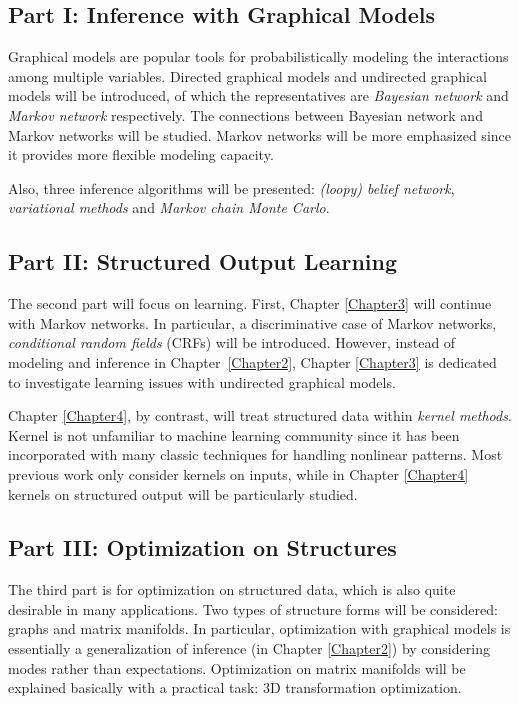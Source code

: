 \subsection{Part I: Inference with Graphical Models}
Graphical models are popular tools for probabilistically modeling the interactions among multiple variables. Directed graphical models and undirected graphical models will be introduced, of which 
the representatives are \emph{Bayesian network} and \emph{Markov network} 
respectively. The connections between Bayesian network and Markov networks will be studied.  Markov networks will be more emphasized 
since it provides more flexible modeling capacity.        

Also, three inference algorithms will be presented: \emph{(loopy) belief network}, \emph{variational methods} and \emph{Markov chain Monte Carlo}. 
\subsection{Part II: Structured Output Learning}
The second part will focus on learning. First, Chapter \ref{Chapter3} will continue with Markov networks. In particular, a discriminative case of Markov networks, \emph{conditional random fields} (CRFs) 
will be introduced. However, instead of modeling and inference in Chapter~\ref{Chapter2}, Chapter \ref{Chapter3} is dedicated to investigate learning issues with undirected graphical models.          

Chapter \ref{Chapter4}, by contrast, will treat structured data within \emph{kernel methods}. Kernel is not unfamiliar to machine learning community since it has been incorporated with many 
classic techniques for handling nonlinear patterns. Most previous work only consider kernels on inputs, while in Chapter \ref{Chapter4} kernels on structured output will be particularly 
studied.         


\subsection{Part III: Optimization on Structures}
The third part is for optimization on structured data, which is also quite desirable in many applications. Two types of structure forms will be considered: graphs and matrix manifolds.         
In particular, optimization with graphical models is essentially a generalization of inference (in Chapter \ref{Chapter2}) by considering modes rather than expectations.            
Optimization on matrix manifolds will be explained basically with a practical task: 3D transformation optimization.      


